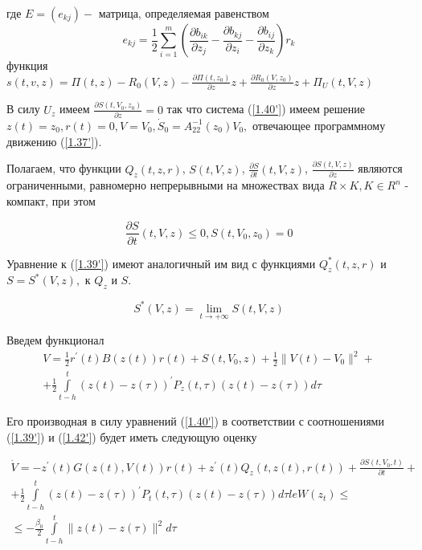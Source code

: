где $E = (e_{kj}) - $ матрица, определяемая равенством 
$$e_{kj} = \frac12 \sum_{ i = 1}^{m} (\frac{\partial b_{ik}}{\partial z_j} - \frac{\partial b_{kj}}{\partial z_i} - \frac{\partial b_{ij}}{\partial z_k}) r_k$$
функция $s(t, v, z) = \Pi (t, z) - R_0 (V, z) - \frac{\partial \Pi (t, z_0)}{\partial z} z + \frac{\partial R_0 (V, z_0)}{\partial z} z + \Pi_U (t, V, z)$

В силу $U_z$ имеем $\frac{\partial S(t, V_0, z_0)}{\partial z} = 0$ так что система (\ref{1.40'}) имеем решение $z(t) = z_0, r(t) = 0, V = V_0, \dot S_0 = A_{22}^{-1} (z_0) V_0,$ отвечающее программному движению (\ref{1.37'}).

Полагаем, что функции $Q_z (t, z, r)$, $S(t, V, z)$, $\frac{\partial S}{\partial t} (t, V, z)$, $\frac{\partial S(t, V, z)}{\partial z}$ являются ограниченными, равномерно непрерывными на множествах вида $R \times K, K \in R^n$ - компакт, при этом

\begin{equation} \label{1.43'}
\frac{\partial S}{\partial t} (t, V, z) \le 0, S(t, V_0, z_0) = 0
\end{equation}

Уравнение к (\ref{1.39'}) имеют аналогичный им вид с функциями $Q_z^{*} (t, z, r)$ и $S = S^{*} (V, z),$ к $Q_z$ и $S.$

$$S^{*} (V, z) = \lim_{t \to + \infty} S(t, V, z)$$

Введем функционал
$$
\begin{array}{c}
\displaystyle V = \frac12 r^{'}(t) B (z(t)) r(t) + S(t, V_0, z) + \frac12 \| V(t) - V_0 \|^2 +\\
\displaystyle + \frac12 \int\limits_{t - h}^{t} (z(t) - z(\tau))^{'} P_z (t, \tau) (z(t) - z(\tau)) d \tau
\end{array}
$$

Его производная в силу уравнений (\ref{1.40'}) в соответствии с соотношениями (\ref{1.39'}) и (\ref{1.42'}) будет иметь следующую оценку

\begin{equation} \label{1.44'}
\begin{array}{c}
\displaystyle \dot V = - z^{'} (t) G(z(t), V(t)) r(t) + z^{'} (t) Q_z (t, z(t), r(t)) + \frac{\partial S(t, V_0, t)}{\partial t} +\\
\displaystyle + \frac12 \displaystyle\int\limits_{t - h}^{t} (z(t) - z(\tau))^{'} P_t(t, \tau) (z(t) - z(\tau)) d \tau le W(z_t) \le\\
\displaystyle \le -\frac{\beta_0}{2} \displaystyle\int\limits_{t - h}^{t} \| z(t) - z(\tau) \|^2 d \tau
\end{array}
\end{equation}

